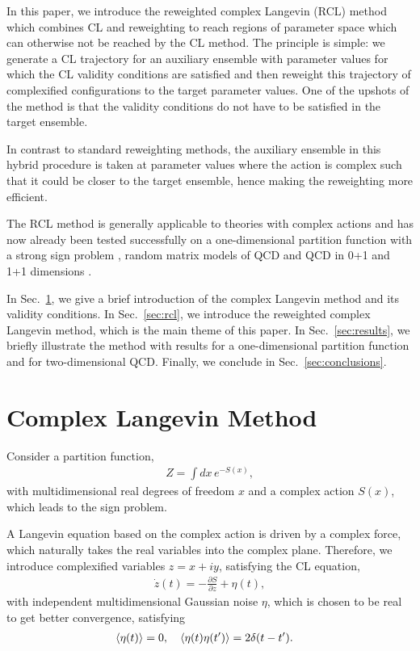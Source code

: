 \documentclass[prd,showpacs,reprint,nofootinbib,showkeys]{revtex4-1}
\begin{document}
In this paper, we introduce the reweighted complex Langevin (RCL) method which combines CL and  reweighting to reach regions of parameter space which can otherwise not be reached by the CL method. The principle is simple: we generate a CL trajectory for an auxiliary ensemble with parameter values for which the CL validity conditions are satisfied and then reweight this trajectory of complexified configurations to the target parameter values. One of the upshots of the method is that the validity conditions do not have to be satisfied in the target ensemble.

In contrast to standard reweighting methods, the auxiliary ensemble in this hybrid procedure is taken at parameter values where the action is complex such that it could be closer to the target ensemble, hence making the reweighting more efficient.

The RCL method is generally applicable to theories with complex actions and has now already been tested successfully on a one-dimensional partition function with a strong sign problem \cite{Nishimura:2015pba,Nagata:2016vkn}, random matrix models of QCD \cite{Mollgaard:2013qra,Meisinger2016,Bloch:2016jwt} and QCD in 0+1 and 1+1 dimensions \cite{Bloch:2015coa,Bloch:2017sfg}. 

In Sec.~\ref{sec:cl}, we give a brief introduction of the complex Langevin method and its validity conditions. In Sec.~\ref{sec:rcl}, we introduce the reweighted complex Langevin method, which is the main theme of this paper. In Sec.~\ref{sec:results}, we briefly illustrate the method with results for a one-dimensional partition function and for two-dimensional QCD. Finally, we conclude in Sec.~\ref{sec:conclusions}.

\section{Complex Langevin Method}
\label{sec:cl}

Consider a partition function,
\begin{align}
Z = \int dx \, e^{-S(x)},
\end{align}
with multidimensional real degrees of freedom $x$ and a complex action $S(x)$, which leads to the sign problem.

A Langevin equation based on the complex action is driven by a complex force, which naturally takes the real variables into the complex plane. Therefore, we introduce complexified variables $z = x + i y$, satisfying the CL equation,
\begin{align}
\dot z(t) = -\frac{\partial S}{\partial z} + \eta(t),
\end{align}
with independent multidimensional Gaussian noise $\eta$, which is chosen to be real to get better convergence, satisfying
\begin{align}
\Braket{\eta(t)} &= 0 , \quad
\Braket{\eta(t)\eta(t')} = 2\delta(t-t') .
\end{align}
\end{document}
